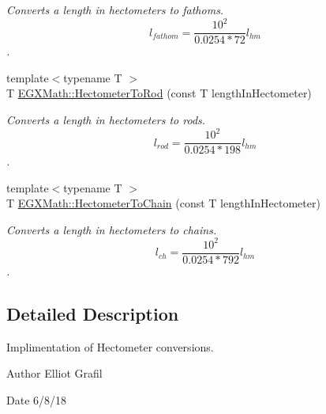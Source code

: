 \begin{DoxyCompactItemize}
\begin{DoxyCompactList}\small\item\em Converts a length in hectometers to fathoms. \[ l_{fathom}= \frac{10^{2}}{0.0254 * 72} l_{hm} \]. \end{DoxyCompactList}\item 
{\footnotesize template$<$typename T $>$ }\\T \mbox{\hyperlink{group___e_g_x_math-_conversions-_length_conversions-_s_i-_hectometer-_surveyors_gafdf1df626e4b3c88f88bd3d6d3545e7d}{E\+G\+X\+Math\+::\+Hectometer\+To\+Rod}} (const T length\+In\+Hectometer)
\begin{DoxyCompactList}\small\item\em Converts a length in hectometers to rods. \[ l_{rod}= \frac{10^{2}}{0.0254 * 198} l_{hm} \]. \end{DoxyCompactList}\item 
{\footnotesize template$<$typename T $>$ }\\T \mbox{\hyperlink{group___e_g_x_math-_conversions-_length_conversions-_s_i-_hectometer-_surveyors_ga02973091150445cfe5798389ecccdceb}{E\+G\+X\+Math\+::\+Hectometer\+To\+Chain}} (const T length\+In\+Hectometer)
\begin{DoxyCompactList}\small\item\em Converts a length in hectometers to chains. \[ l_{ch}= \frac{10^{2}}{0.0254 * 792} l_{hm} \]. \end{DoxyCompactList}\end{DoxyCompactItemize}


\subsection{Detailed Description}
Implimentation of Hectometer conversions. 

\begin{DoxyAuthor}{Author}
Elliot Grafil 
\end{DoxyAuthor}
\begin{DoxyDate}{Date}
6/8/18 
\end{DoxyDate}
